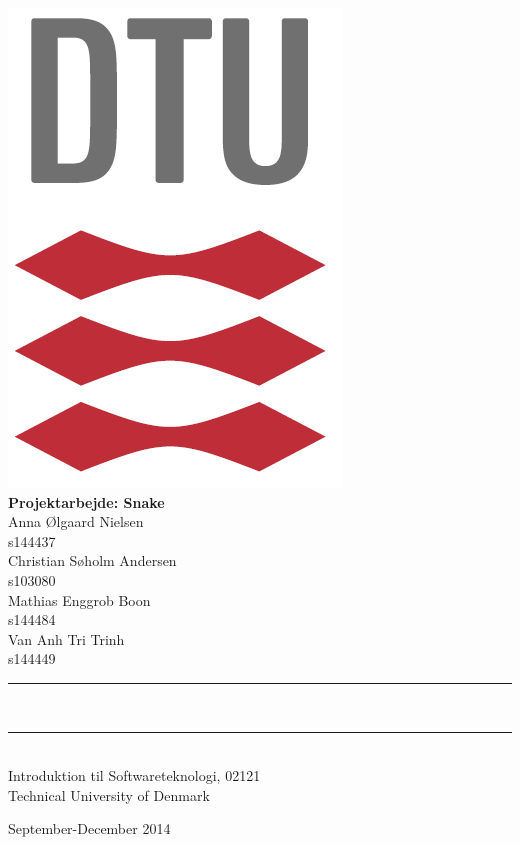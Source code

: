\begin{center}

\vspace*{-30mm} \noindent
\hfill \includegraphics[height=15 mm]{pics/DTULogo.png} \\[30mm]

{\Huge \bf Projektarbejde: Snake %
}\\[15mm]

{\Large Anna Ølgaard Nielsen} \\  s144437 \\[5mm]
{\Large Christian Søholm Andersen} \\  s103080 \\[5mm]
{\Large Mathias Enggrob Boon} \\  s144484 \\[5mm]
{\Large Van Anh Tri Trinh } \\  s144449 \\[12mm]

\rule{\textwidth}{0.5pt}\\[4mm]                   
\rule{\textwidth}{0.5pt}\\[12mm]                         

Introduktion til Softwareteknologi,  02121\\              
Technical University of Denmark\\[4mm]                    
\centerline{\large September-December 2014}                         

\end{center}
\thispagestyle{empty}
\newpage
